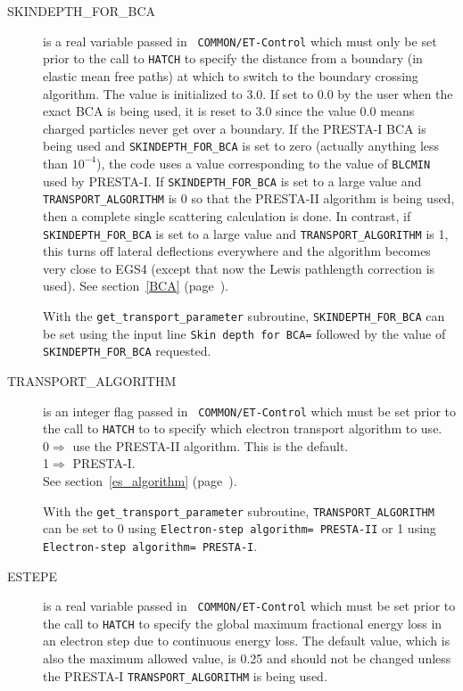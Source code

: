 \begin{description}
\item[SKINDEPTH\_FOR\_BCA] is a real variable passed  in {\tt
COMMON/ET-Control} which must only be set prior to the call to {\tt HATCH} to specify
the distance from a boundary (in elastic mean free paths) at which to
switch to the boundary crossing
algorithm. The value  is initialized to 3.0. If set to 0.0 by the user when
the exact BCA is being used, it is reset to 3.0 since the value 0.0 means
charged particles never get over a boundary.  If the PRESTA-I BCA is being
used and {\tt SKINDEPTH\_FOR\_BCA} is set to zero (actually anything less
than $10^{-4}$), the code uses a value corresponding to the value of
{\tt BLCMIN} used by PRESTA-I.
If {\tt SKINDEPTH\_FOR\_BCA} is
set to a large value and {\tt TRANSPORT\_ALGORITHM} is 0 so that the PRESTA-II
algorithm is being used, then a complete single scattering calculation
is done. In contrast, if {\tt SKINDEPTH\_FOR\_BCA} is set to a large value and
{\tt TRANSPORT\_ALGORITHM} is 1, this turns off lateral deflections everywhere
and the algorithm becomes very close to EGS4 (except that now the Lewis
pathlength correction is used). See section~\ref{BCA} (page~\pageref{BCA}).

With the {\tt get\_transport\_parameter} subroutine, {\tt SKINDEPTH\_FOR\_BCA} can be set
using the input line {\tt Skin depth for BCA=} followed by the value
of {\tt SKINDEPTH\_FOR\_BCA} requested.

\item[TRANSPORT\_ALGORITHM] is an integer flag passed  in {\tt
COMMON/ET-Control} which must be set prior to the call to {\tt HATCH} to to
specify which electron transport algorithm to use.\\
0$\Rightarrow$ use the PRESTA-II algorithm. This is the default.\\
1$\Rightarrow$ PRESTA-I.\\
See section~\ref{es_algorithm} (page~\pageref{es_algorithm}).

With the {\tt get\_transport\_parameter} subroutine, {\tt TRANSPORT\_ALGORITHM} can
be set to 0 using {\tt Electron-step algorithm= PRESTA-II} or 1 using
{\tt Electron-step algorithm= PRESTA-I}.


\item[ESTEPE] is a real variable passed  in {\tt
COMMON/ET-Control} which must be set prior to the call to {\tt HATCH} to
specify the global maximum fractional energy loss in an electron
step due to continuous energy loss. The default value, which is also the
maximum allowed value, is 0.25 and should
not be changed unless the PRESTA-I {\tt TRANSPORT\_ALGORITHM} is being used.


\end{description}
